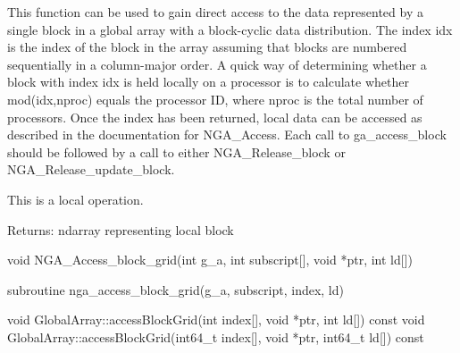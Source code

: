 \documentclass[12pt]{article}
\begin{document}
\begin{desc}

This function can be used to gain direct access to the data represented 
by a single block in a global array with a block-cyclic data distribution. 
The index idx is the index of the block in the array assuming that blocks 
are numbered sequentially in a column-major order. A quick way of determining 
whether a block with index idx is held locally on a processor is to calculate 
whether mod(idx,nproc) equals the processor ID, where nproc is the total number 
of processors. Once the index has been returned, local data can be accessed as 
described in the documentation for NGA_Access. Each call to ga_access_block 
should be followed by a call to either NGA_Release_block or NGA_Release_update_block.

This is a local operation.

Returns: ndarray representing local block  
\end{desc}


\begin{capi}
\begin{ccode}
void NGA_Access_block_grid(int g_a, int subscript[], void *ptr, int ld[])
\end{ccode}
\begin{funcargs}
\end{funcargs}
\end{capi}

\begin{fapi}
\begin{fcode}
subroutine nga_access_block_grid(g_a, subscript, index, ld)
\end{fcode}
\begin{funcargs}
\end{funcargs}
\end{fapi}

\begin{cxxapi}
\begin{cxxcode}
void GlobalArray::accessBlockGrid(int index[], void *ptr, int ld[]) const
void GlobalArray::accessBlockGrid(int64_t index[], void *ptr, int64_t ld[])
                                  const
\end{cxxcode}
\begin{funcargs}
\end{funcargs}
\end{cxxapi}
\end{document}
